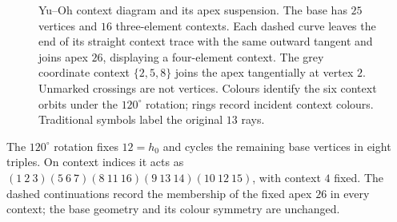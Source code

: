 \documentclass[aps,pra,onecolumn,amsmath,amssymb,nofootinbib]{revtex4-2}
\begin{document}
\begin{figure}[ht]
{%
}
\caption{Yu--Oh context diagram and its apex suspension. The base has $25$ vertices and $16$ three-element contexts. Each dashed curve leaves the end of its straight context trace with the same outward tangent and joins apex $26$, displaying a four-element context. The grey coordinate context $\{2,5,8\}$ joins the apex tangentially at vertex $2$. Unmarked crossings are not vertices. Colours identify the six context orbits under the $120^\circ$ rotation; rings record incident context colours. Traditional symbols label the original $13$ rays.}\label{fig:yuoh-symmetric}
\end{figure}

The $120^\circ$ rotation fixes $12=h_0$ and cycles the remaining base vertices in eight triples. On context indices it acts as $(1\ 2\ 3)(5\ 6\ 7)(8\ 11\ 16)(9\ 13\ 14)(10\ 12\ 15)$, with context $4$ fixed. The dashed continuations record the membership of the fixed apex $26$ in every context; the base geometry and its colour symmetry are unchanged.


\end{document}
